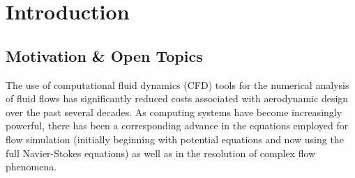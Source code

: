 \documentclass[12pt,Bold,letterpaper,TexShade]{mcgilletdclass}
\numberwithin{equation}{section}
\begin{document}
\begin{romanPagenumber}{2}%

%
%
\Dedication%

%
%
\Acknowledge%


%
\AbstractEn%

%
%
\AbstractFr%

\begingroup
\hypersetup{linkcolor=black}
%
%
%
\tableofcontents %
\listoftables %
\listoffigures %
\endgroup

\end{romanPagenumber}

 
\chapter{Introduction}
\section{Motivation \& Open Topics}

The use of computational fluid dynamics (CFD) tools for the numerical analysis of fluid flows has significantly reduced costs associated with aerodynamic design over the past several decades. As computing systems have become increasingly powerful, there has been a corresponding advance in the equations employed for flow simulation (initially beginning with potential equations and now using the full Navier-Stokes equations) as well as in the resolution of complex flow phenomena.
\\~
\end{document}
